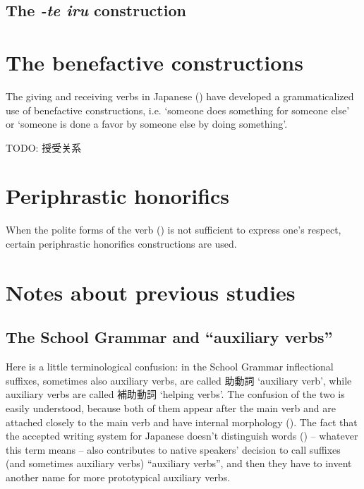 \documentclass[UTF8, a4paper, oneside, scheme=plain]{ctexrep}
\newcommand{\corpus}[1]{\emph{#1}}
\newcommand{\translate}[1]{`#1'}
\begin{document}
\subsection{The \corpus{-te iru} construction}\label{sec:te-iru}

\section{The benefactive constructions}

The giving and receiving verbs in Japanese () 
have developed a grammaticalized use of benefactive constructions,
i.e. \translate{someone does something for someone else}
or \translate{someone is done a favor by someone else by doing something}.

TODO: 授受关系

\section{Periphrastic honorifics}\label{sec:honorifics-constructions}

When the polite forms of the verb () 
is not sufficient to express one's respect,
certain periphrastic honorifics constructions are used.

\section{Notes about previous studies}\label{sec:verb-complex-previous}

\subsection{The School Grammar and ``auxiliary verbs''}\label{sec:so-called-auxiliary-verb}

Here is a little terminological confusion:
in the School Grammar inflectional suffixes,
sometimes also auxiliary verbs, are called 助動詞 \translate{auxiliary verb},
while auxiliary verbs are called 補助動詞 \translate{helping verbs}.
The confusion of the two is easily understood,
because both of them appear after the main verb
and are attached closely to the main verb 
and have internal morphology ().
The fact that the accepted writing system for Japanese doesn't distinguish words 
() -- whatever this term means -- 
also contributes to native speakers' decision to call suffixes (and sometimes auxiliary verbs) ``auxiliary verbs'',
and then they have to invent another name for more prototypical auxiliary verbs.
\end{document}
